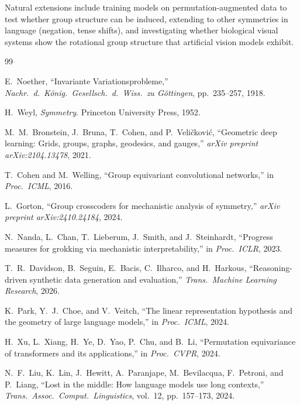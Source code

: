 \documentclass[10pt, letterpaper]{article}
\begin{document}
Natural extensions include training models on permutation-augmented data to test whether group structure can be induced, extending to other symmetries in language (negation, tense shifts), and investigating whether biological visual systems show the rotational group structure that artificial vision models exhibit.

\begin{thebibliography}{99}

E.~Noether, ``Invariante Variationsprobleme,'' \textit{Nachr.\ d.\ K\"onig.\ Gesellsch.\ d.\ Wiss.\ zu G\"ottingen}, pp.~235--257, 1918.

H.~Weyl, \textit{Symmetry}. Princeton University Press, 1952.

M.~M.~Bronstein, J.~Bruna, T.~Cohen, and P.~Veli\v{c}kovi\'{c}, ``Geometric deep learning: Grids, groups, graphs, geodesics, and gauges,'' \textit{arXiv preprint arXiv:2104.13478}, 2021.

T.~Cohen and M.~Welling, ``Group equivariant convolutional networks,'' in \textit{Proc.\ ICML}, 2016.

L.~Gorton, ``Group crosscoders for mechanistic analysis of symmetry,'' \textit{arXiv preprint arXiv:2410.24184}, 2024.

N.~Nanda, L.~Chan, T.~Lieberum, J.~Smith, and J.~Steinhardt, ``Progress measures for grokking via mechanistic interpretability,'' in \textit{Proc.\ ICLR}, 2023.

T.~R.~Davidson, B.~Seguin, E.~Bacis, C.~Ilharco, and H.~Harkous, ``Reasoning-driven synthetic data generation and evaluation,'' \textit{Trans.\ Machine Learning Research}, 2026.

K.~Park, Y.~J.~Choe, and V.~Veitch, ``The linear representation hypothesis and the geometry of large language models,'' in \textit{Proc.\ ICML}, 2024.

H.~Xu, L.~Xiang, H.~Ye, D.~Yao, P.~Chu, and B.~Li, ``Permutation equivariance of transformers and its applications,'' in \textit{Proc.\ CVPR}, 2024.

N.~F.~Liu, K.~Lin, J.~Hewitt, A.~Paranjape, M.~Bevilacqua, F.~Petroni, and P.~Liang, ``Lost in the middle: How language models use long contexts,'' \textit{Trans.\ Assoc.\ Comput.\ Linguistics}, vol.~12, pp.~157--173, 2024.


\end{thebibliography}
\end{document}
